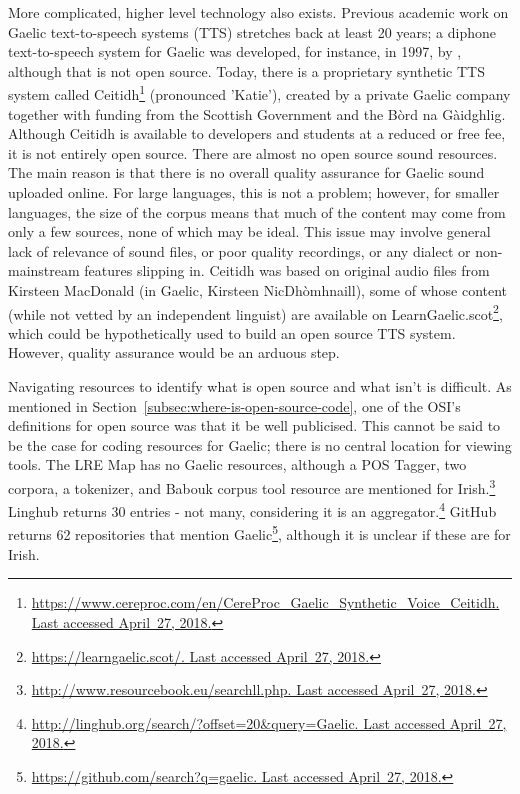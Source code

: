  More complicated, higher level technology also exists. Previous academic work on Gaelic text-to-speech systems (TTS) stretches back at least 20 years; a diphone text-to-speech system for Gaelic was developed, for instance, in 1997, by \citet{wolters1997diphone}, although that is not open source. Today, there is a proprietary synthetic TTS system called Ceitidh\footnote{\href{https://www.cereproc.com/en/CereProc_Gaelic_Synthetic_Voice_Ceitidh}{https://www.cereproc.com/en/CereProc\_Gaelic\_Synthetic\_Voice\_Ceitidh. Last accessed April~27, 2018.}} (pronounced 'Katie'), created by a private Gaelic company together with funding from the Scottish Government and the B\`ord na G\`aidghlig. Although Ceitidh is available to developers and students at a reduced or free fee, it is not entirely open source. There are almost no open source sound resources. The main reason is that there is no overall quality assurance for Gaelic sound uploaded online. For large languages, this is not a problem; however, for smaller languages, the size of the corpus means that much of the content may come from only a few sources, none of which may be ideal. This issue may involve general lack of relevance of sound files, or poor quality recordings, or any dialect or non-mainstream features slipping in. Ceitidh was based on original audio files from Kirsteen MacDonald (in Gaelic, Kirsteen NicDh\`{o}mhnaill), some of whose content (while not vetted by an independent linguist) are available on LearnGaelic.scot\footnote{\href{https://learngaelic.scot/}{https://learngaelic.scot/. Last accessed April~27, 2018.}}, which could be hypothetically used to build an open source TTS system. However, quality assurance would be an arduous step.
 
Navigating resources to identify what is open source and what isn't is difficult. As mentioned in Section~\ref{subsec:where-is-open-source-code}, one of the OSI's definitions for open source was that it be well publicised. This cannot be said to be the case for coding resources for Gaelic; there is no central location for viewing tools. The LRE Map has no Gaelic resources, although a POS Tagger, two corpora, a tokenizer, and Babouk corpus tool resource are mentioned for Irish.\footnote{\href{http://www.resourcebook.eu/searchll.php}{http://www.resourcebook.eu/searchll.php. Last accessed April~27, 2018.}} Linghub returns 30 entries - not many, considering it is an aggregator.\footnote{\href{http://linghub.org/search/?offset=20&query=Gaelic}{http://linghub.org/search/?offset=20\&query=Gaelic. Last accessed April~27, 2018.}} GitHub returns 62 repositories that mention Gaelic\footnote{\href{https://github.com/search?q=gaelic}{https://github.com/search?q=gaelic. Last accessed April~27, 2018.}}, although it is unclear if these are for Irish.

